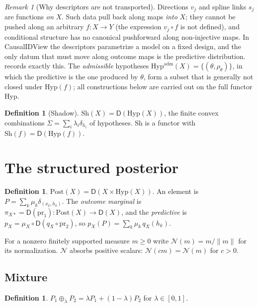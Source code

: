 \documentclass[11pt]{article}
\theoremstyle{definition}
\newtheorem{definition}[theorem]{Definition}
\theoremstyle{remark}
\newtheorem{remark}[theorem]{Remark}
\newcommand{\D}{\mathsf{D}}
\newcommand{\Hyp}{\mathrm{Hyp}}
\newcommand{\Sh}{\mathrm{Sh}}
\newcommand{\Post}{\mathrm{Post}}
\newcommand{\N}{\mathcal{N}}
\begin{document}
\begin{remark}[Why descriptors are not transported]\label{rem:variance}
Directions $v_j$ and spline links $s_j$ are functions \emph{on} $X$. Such data pull back along maps
\emph{into} $X$; they cannot be pushed along an arbitrary $f\colon X\to Y$ (the expression $v_j\circ f$
is not defined), and conditional structure has no canonical pushforward along non-injective maps. In
CausalIDView the descriptors parametrize a model on a fixed design, and the only datum that must move
along outcome maps is the predictive distribution.  records exactly this. The
\emph{admissible} hypotheses $\Hyp^{\mathrm{adm}}(X)=\{(\theta,\rho_\theta)\}$, in which the
predictive is the one produced by $\theta$, form a subset that is generally not closed under
$\Hyp(f)$; all constructions below are carried out on the full functor $\Hyp$.
\end{remark}

\begin{definition}[Shadow]
$\Sh(X)=\D(\Hyp(X))$, the finite convex combinations $\Sigma=\sum_i\lambda_i\delta_{h_i}$ of
hypotheses. $\Sh$ is a functor with $\Sh(f)=\D(\Hyp(f))$.
\end{definition}

\section{The structured posterior}\label{sec:post}

\begin{definition}
$\Post(X)=\D(X\times\Hyp(X))$. An element is $P=\sum_k\mu_k\delta_{(x_k,h_k)}$. The \emph{outcome
marginal} is $\pi_{X*}=\D(\mathrm{pr}_1)\colon\Post(X)\to\D(X)$, and the \emph{predictive} is
$p_X=\mu_X\circ\D(q_X\circ\mathrm{pr}_2)$, so $p_X(P)=\sum_k\mu_k\,q_X(h_k)$.
\end{definition}

For a nonzero finitely supported measure $m\ge 0$ write $\N(m)=m/\lVert m\rVert$ for its
normalization. $\N$ absorbs positive scalars: $\N(cm)=\N(m)$ for $c>0$.

\subsection{Mixture}

\begin{definition}
$P_1\oplus_\lambda P_2=\lambda P_1+(1-\lambda)P_2$ for $\lambda\in[0,1]$.
\end{definition}
\end{document}
